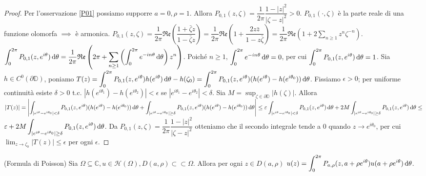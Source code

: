 \begin{proof}
  Per l'osservazione \ref{P01} possiamo supporre $a=0,\rho=1$. Allora $P_{0,1}(z,\zeta)=\dfrac{1}{2\pi}\dfrac{1-|z|^2}{|\zeta-z|^2}>0$. $P_{0,1}(\cdot,\zeta)$ è la parte reale di una funzione olomorfa $\implies$ è armonica.
  $\displaystyle P_{0,1}(z, \zeta)=\dfrac{1}{2\pi}\mathfrak{Re}\left(\dfrac{1+\bar{\zeta}z}{1-\bar{\zeta}z}\right)=\dfrac{1}{2\pi}\mathfrak{Re}\left(1+\dfrac{2z\bar{z}}{1-z\bar{\zeta}}\right)=\dfrac{1}{2\pi}\mathfrak{Re}\left(1+2\sum_{n \ge 1} z^n\zeta^{-n}\right)$.
  $\displaystyle \int_0^{2\pi} P_{0,1}(z,e^{i\theta})\mathop{}\!\mathrm{d}\theta=\dfrac{1}{2\pi}\mathfrak{Re}\left(2\pi+\sum_{n \ge 1} \left(\int_0^{2\pi} e^{-in\theta}\mathop{}\!\mathrm{d}\theta \right)z^n\right)$.
  Poiché $n \ge 1$, $\displaystyle \int_0^{2\pi} e^{-in\theta}\mathop{}\!\mathrm{d}\theta=0$, per cui $\displaystyle  \int_0^{2\pi} P_{0,1}(z,e^{i\theta})\mathop{}\!\mathrm{d}\theta=1$.
  Sia $h \in C^0(\partial \mathbb{D})$, poniamo $\displaystyle T(z)=\int_0^{2\pi} P_{0,1}(z,e^{i\theta})h(e^{i\theta})\mathop{}\!\mathrm{d}\theta-h(\zeta_0)=\int_0^{2\pi} P_{0,1}(z,e^{i\theta})(h(e^{i\theta})-h(e^{i\theta_0}))\mathop{}\!\mathrm{d}\theta$.
  Fissiamo $\epsilon>0$; per uniforme continuità esiste $\delta>0$ t.c. $|h(e^{i\theta_1})-h(e^{i\theta_2})|<\epsilon$ se $|e^{i\theta_1}-e^{i\theta_2}|<\delta$. Sia $\displaystyle M=\sup_{\zeta \in \partial \mathbb{D}} |h(\zeta)|$.
  Allora $\displaystyle |T(z)|=\left|\int_{|e^{i\theta}-e^{i\theta_0}|<\delta} P_{0,1}(z,e^{i\theta})(h(e^{i\theta})-h(e^{i\theta_0}))\mathop{}\!\mathrm{d}\theta+\int_{|e^{i\theta}-e^{i\theta_0}|\ge\delta} P_{0,1}(z,e^{i\theta})(h(e^{i\theta})-h(e^{i\theta_0}))\mathop{}\!\mathrm{d}\theta\right| \le \varepsilon\int_{|e^{i\theta}-e^{i\theta_0}|<\delta} P_{0,1}(z,e^{i\theta})\mathop{}\!\mathrm{d}\theta+2M\int_{|e^{i\theta}-e^{i\theta_0}|\ge\delta} P_{0,1}(z,e^{i\theta})\mathop{}\!\mathrm{d}\theta \le$ \\
  $\displaystyle \varepsilon+2M\int_{|e^{i\theta}-e^{i\theta_0}|\ge\delta} P_{0,1}(z,e^{i\theta})\mathop{}\!\mathrm{d}\theta$.
  Da $P_{0,1}(z,\zeta)=\dfrac{1}{2\pi}\dfrac{1-|z|^2}{|\zeta-z|^2}$ otteniamo che il secondo integrale tende a $0$ quando $z \longrightarrow e^{i\theta_0}$, per cui $\displaystyle \lim_{z \longrightarrow \zeta_0} |T(z)| \le \epsilon$ per ogni $\epsilon$.
\end{proof}

\begin{cor}
  (Formula di Poisson) Sia $\Omega \subseteq \mathbb{C}, u \in \mathcal{H}(\Omega), D(a, \rho) \subset\subset \Omega$. Allora per ogni $z \in D(a,\rho)$ $\displaystyle u(z)=\int_0^{2\pi} P_{a,\rho}(z,a+\rho e^{i\theta})u(a+\rho e^{i\theta})\mathop{}\!\mathrm{d}\theta$.
\end{cor}

